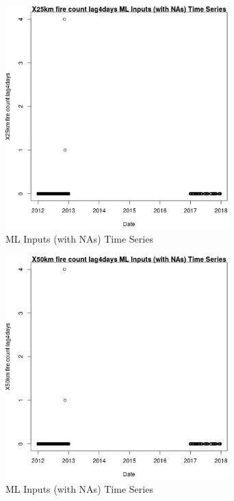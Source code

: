 \begin{figure} 
\centering  
\includegraphics[width=0.77\textwidth]{Code_Outputs/Report_ML_input_PM25_Step4_part_e_de_duplicated_aves_compiled_2019-05-14wNAs_X25km_fire_count_lag4daysvDate.jpg} 
\caption{\label{fig:Report_ML_input_PM25_Step4_part_e_de_duplicated_aves_compiled_2019-05-14wNAsX25km_fire_count_lag4daysvDate}ML Inputs (with NAs) Time Series} 
\end{figure} 
 

\begin{figure} 
\centering  
\includegraphics[width=0.77\textwidth]{Code_Outputs/Report_ML_input_PM25_Step4_part_e_de_duplicated_aves_compiled_2019-05-14wNAs_X50km_fire_count_lag4daysvDate.jpg} 
\caption{\label{fig:Report_ML_input_PM25_Step4_part_e_de_duplicated_aves_compiled_2019-05-14wNAsX50km_fire_count_lag4daysvDate}ML Inputs (with NAs) Time Series} 
\end{figure} 
 

